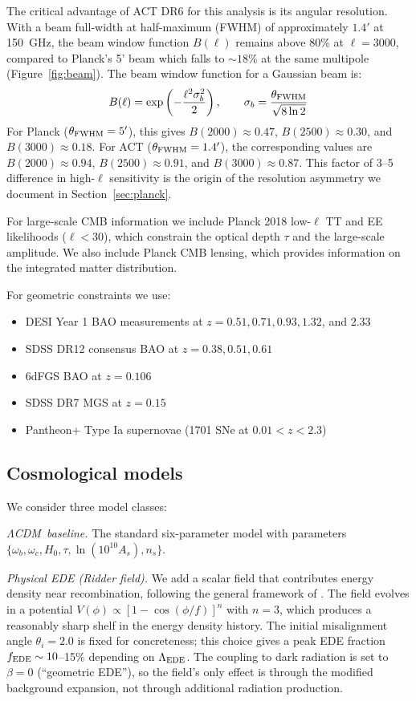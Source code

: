 \documentclass[twocolumn,showpacs,preprintnumbers,amsmath,amssymb,prd]{revtex4-2}
\newcommand{\lcdm}{$\Lambda$CDM}
\begin{document}
The critical advantage of ACT DR6 for this analysis is its angular resolution. 
With a beam full-width at half-maximum (FWHM) of approximately $1.4'$ at 150~GHz, 
the beam window function $B(\ell)$ remains above 80\% at $\ell = 3000$, compared 
to Planck's 5' beam which falls to $\sim 18\%$ at the same multipole (Figure~\ref{fig:beam}). 
The beam window function for a Gaussian beam is:
\begin{equation}
B(\ell) = \exp\left(-\frac{\ell^2 \sigma_b^2}{2}\right), \qquad 
\sigma_b = \frac{\theta_{\rm FWHM}}{\sqrt{8\ln 2}}
\label{eq:beam}
\end{equation}
For Planck ($\theta_{\rm FWHM} = 5'$), this gives $B(2000) \approx 0.47$, 
$B(2500) \approx 0.30$, and $B(3000) \approx 0.18$. For ACT ($\theta_{\rm FWHM} = 1.4'$), 
the corresponding values are $B(2000) \approx 0.94$, $B(2500) \approx 0.91$, 
and $B(3000) \approx 0.87$. This factor of 3--5 difference in high-$\ell$ sensitivity 
is the origin of the resolution asymmetry we document in Section~\ref{sec:planck}.

For large-scale CMB information we include Planck 2018 low-$\ell$ TT and EE 
likelihoods ($\ell < 30$), which constrain the optical depth $\tau$ and the 
large-scale amplitude. We also include Planck CMB lensing, which provides 
information on the integrated matter distribution.

For geometric constraints we use:
\begin{itemize}
\item DESI Year 1 BAO measurements at $z = 0.51, 0.71, 0.93, 1.32$, and $2.33$
\item SDSS DR12 consensus BAO at $z = 0.38, 0.51, 0.61$
\item 6dFGS BAO at $z = 0.106$
\item SDSS DR7 MGS at $z = 0.15$
\item Pantheon+ Type Ia supernovae (1701 SNe at $0.01 < z < 2.3$)
\end{itemize}

\subsection{Cosmological models}

We consider three model classes:

\emph{\lcdm\ baseline.} The standard six-parameter model with parameters 
$\{\omega_b, \omega_c, H_0, \tau, \ln(10^{10}A_s), n_s\}$.

\emph{Physical EDE (Ridder field).} We add a scalar field that contributes 
energy density near recombination, following the general framework of 
\cite{Poulin2019,Smith2020}. The field evolves in a potential $V(\phi) \propto 
[1 - \cos(\phi/f)]^n$ with $n = 3$, which produces a reasonably sharp shelf in 
the energy density history. The initial misalignment angle $\theta_i = 2.0$ is 
fixed for concreteness; this choice gives a peak EDE fraction $f_{\rm EDE} 
\sim 10$--15\% depending on $\Lambda_{\rm EDE}$. The coupling to dark radiation 
is set to $\beta = 0$ (``geometric EDE''), so the field's only effect is through 
the modified background expansion, not through additional radiation production.
\end{document}
